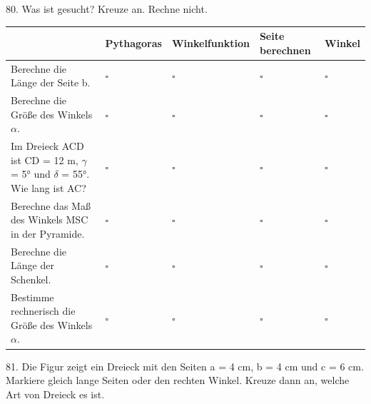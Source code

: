 \documentclass[11pt]{article}
\begin{document}
\par\Needspace*{0.55\textheight}
\begin{pfaufg}{}{80.}{}
Was ist gesucht? Kreuze an. Rechne nicht.
\par\smallskip\noindent \begingroup\renewcommand{\arraystretch}{1.4}\begin{tabular}{|>{\raggedright\arraybackslash}p{4.3cm}|>{\centering\arraybackslash\hyphenpenalty=0}p{1.55cm}|>{\centering\arraybackslash\hyphenpenalty=0}p{1.55cm}|>{\centering\arraybackslash\hyphenpenalty=0}p{1.55cm}|>{\centering\arraybackslash\hyphenpenalty=0}p{1.55cm}|}\hline  & {\scriptsize\hspace{0pt}Pythagoras} & {\scriptsize\hspace{0pt}Winkelfunktion} & {\scriptsize\hspace{0pt}Seite berechnen} & {\scriptsize\hspace{0pt}Winkel} \\ \hline Berechne die Länge der Seite b. & $\square$ & $\square$ & $\square$ & $\square$ \\ \hline Berechne die Größe des Winkels $\alpha$. & $\square$ & $\square$ & $\square$ & $\square$ \\ \hline Im Dreieck ACD ist CD = 12 m, $\gamma$ = 5° und $\delta$ = 55°. Wie lang ist AC? & $\square$ & $\square$ & $\square$ & $\square$ \\ \hline Berechne das Maß des Winkels MSC in der Pyramide. & $\square$ & $\square$ & $\square$ & $\square$ \\ \hline Berechne die Länge der Schenkel. & $\square$ & $\square$ & $\square$ & $\square$ \\ \hline Bestimme rechnerisch die Größe des Winkels $\alpha$. & $\square$ & $\square$ & $\square$ & $\square$ \\ \hline\end{tabular}\endgroup\par
\end{pfaufg}
\pfgruppe{}
\begin{pfaufg}{}{81.}{}
Die Figur zeigt ein Dreieck mit den Seiten a = 4 cm, b = 4 cm und c = 6 cm. Markiere gleich lange Seiten oder den rechten Winkel. Kreuze dann an, welche Art von Dreieck es ist. 
\par\smallskip\noindent {}\par
{}
\end{pfaufg}
\end{document}
